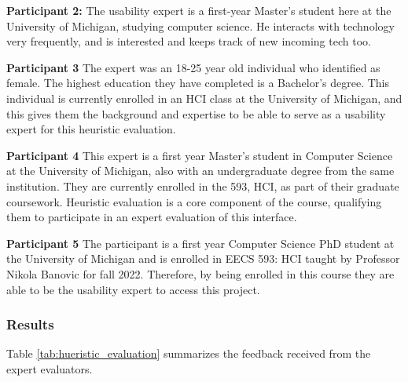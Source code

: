 \documentclass[acmsmall,screen,authorversion,nonacm]{acmart}
\begin{document}
\textbf{Participant 2: }The usability expert is a first-year Master's student here at the University of Michigan, studying computer science. He interacts with technology very frequently, and is interested and keeps track of new incoming tech too. 

\textbf{Participant 3} The expert was an 18-25 year old individual who identified as female. The highest education they have completed is a Bachelor’s degree. This individual is currently enrolled in an HCI class at the University of Michigan, and this gives them the background and expertise to be able to serve as a usability expert for this heuristic evaluation. 

\textbf{Participant 4} This expert is a first year Master's student in Computer Science at the University of Michigan, also with an undergraduate degree from the same institution. They are currently enrolled in the 593, HCI, as part of their graduate coursework. Heuristic evaluation is a core component of the course, qualifying them to participate in an expert evaluation of this interface.

\textbf{Participant 5} The participant is a first year Computer Science PhD student at the University of Michigan and is enrolled in EECS 593: HCI taught by Professor Nikola Banovic for fall 2022. Therefore, by being enrolled in this course they are able to be the usability expert to access this project.


\subsubsection{Results}

Table \ref{tab:hueristic_evaluation} summarizes the feedback received from the expert evaluators.
\end{document}
